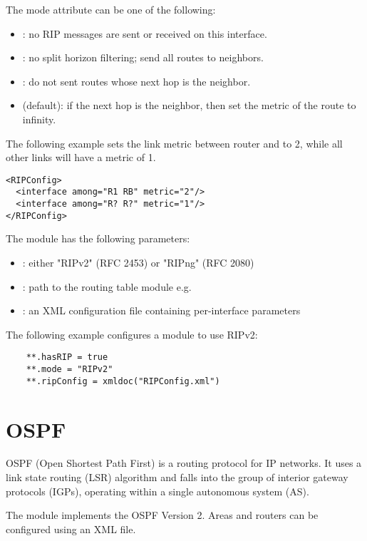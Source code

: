 The mode attribute can be one of the following:
\begin{itemize}
  \item {}: no RIP messages are sent or received on this interface.
  \item {}: no split horizon filtering; send all routes to
        neighbors.
  \item {}: do not sent routes whose next hop is the neighbor.
  \item {} (default): if the next hop is the neighbor, then
  set the metric of the route to infinity.
\end{itemize}

The following example sets the link metric between router
 and  to 2, while all other links will have a metric of 1.
\begin{verbatim}
<RIPConfig>
  <interface among="R1 RB" metric="2"/>
  <interface among="R? R?" metric="1"/>
</RIPConfig>
\end{verbatim}

The  module has the following parameters:
\begin{itemize}
  \item {}: either "RIPv2" (RFC 2453) or "RIPng" (RFC 2080)
  \item {}: path to the routing table module
        e.g. 
  \item {}: an XML configuration file containing per-interface parameters
\end{itemize}

The following example configures a  module to use RIPv2:
\begin{verbatim}
    **.hasRIP = true
    **.mode = "RIPv2"
    **.ripConfig = xmldoc("RIPConfig.xml")
\end{verbatim}

\section{OSPF}
\label{sec:ospf}

OSPF (Open Shortest Path First) is a routing protocol for IP networks.
It uses a link state routing (LSR) algorithm and falls into the group
of interior gateway protocols (IGPs), operating within a single
autonomous system (AS).

The  module implements the OSPF Version 2. Areas and routers
can be configured using an XML file.

